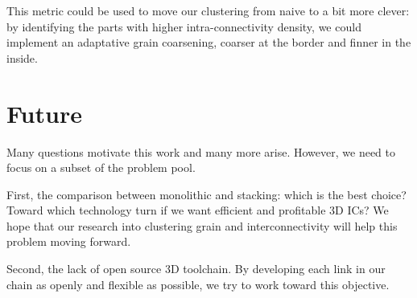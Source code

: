 \documentclass[11pt,a4paper]{report} %
\theoremstyle{customdef}
\begin{document}
This metric could be used to move our clustering from naive to a bit more clever: by identifying the parts with higher intra-connectivity density, we could implement an adaptative grain coarsening, coarser at the border and finner in the inside.




\chapter{Future}\label{chap:future}
Many questions motivate this work and many more arise.
However, we need to focus on a subset of the problem pool.

First, the comparison between monolithic and stacking: which is the best choice?
Toward which technology turn if we want efficient and profitable 3D ICs?
We hope that our research into clustering grain and interconnectivity will help this problem moving forward.

Second, the lack of open source 3D toolchain.
By developing each link in our chain as openly and flexible as possible, we try to work toward this objective.
\end{document}
